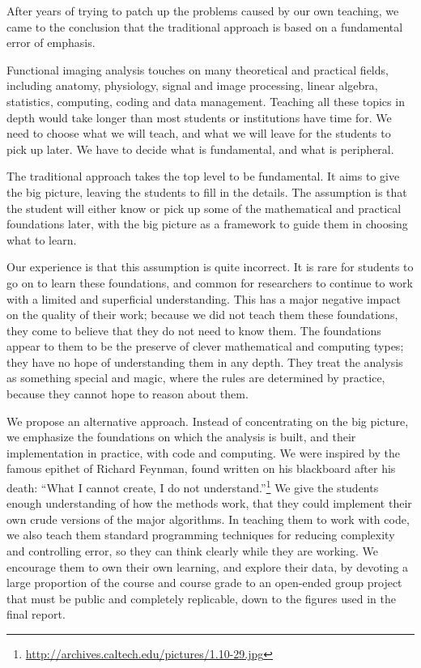 After years of trying to patch up the problems caused by our own teaching, we
came to the conclusion that the traditional approach is based on a fundamental
error of emphasis.

Functional imaging analysis touches on many theoretical and practical fields,
including anatomy, physiology, signal and image processing, linear algebra,
statistics, computing, coding and data management.  Teaching all these topics
in depth would take longer than most students or institutions have time for.
We need to choose what we will teach, and what we will leave for the students
to pick up later. We have to decide what is fundamental, and what is
peripheral.

The traditional approach takes the top level to be fundamental.  It aims to
give the big picture, leaving the students to fill in the details. The
assumption is that the student will either know or pick up some of the
mathematical and practical foundations later, with the big picture as a
framework to guide them in choosing what to learn.

Our experience is that this assumption is quite incorrect.  It is rare for
students to go on to learn these foundations, and common for researchers to
continue to work with a limited and superficial understanding.  This has a
major negative impact on the quality of their work; because we did not teach
them these foundations, they come to believe that they do not need to know
them.  The foundations appear to them to be the preserve of clever
mathematical and computing types; they have no hope of understanding them in
any depth.  They treat the analysis as something special and magic, where the
rules are determined by practice, because they cannot hope to reason about
them.

We propose an alternative approach.  Instead of
concentrating on the big picture, we emphasize the foundations on which the
analysis is built, and their implementation in practice, with code and
computing.  We were inspired by the famous epithet of Richard Feynman, found
written on his blackboard after his death: ``What I cannot create, I do not
understand.''\footnote{\url{http://archives.caltech.edu/pictures/1.10-29.jpg}}
We give the students enough understanding of how the methods work, that
they could implement their own crude versions of the major algorithms.  In
teaching them to work with code, we also teach them standard programming
techniques for reducing complexity and controlling error, so they can think
clearly while they are working.  We encourage them to own their own learning,
and explore their data, by devoting a large proportion of the course and
course grade to an open-ended group project that must be public and completely
replicable, down to the figures used in the
final report.

